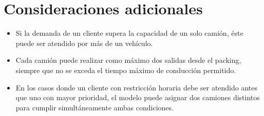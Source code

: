 \documentclass[11pt]{article}
\begin{document}
\section*{Consideraciones adicionales}
\begin{itemize}
  \item Si la demanda de un cliente supera la capacidad de un solo camión, éste puede ser atendido por más de un vehículo.
  \item Cada camión puede realizar como máximo dos salidas desde el packing, siempre que no se exceda el tiempo máximo de conducción permitido.
  \item En los casos donde un cliente con restricción horaria debe ser atendido antes que uno con mayor prioridad, el modelo puede asignar dos camiones distintos para cumplir simultáneamente ambas condiciones.
\end{itemize}
\end{document}
